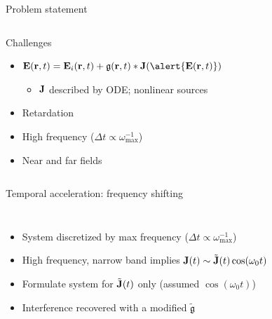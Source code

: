 \documentclass[aspectratio=169, usenames, dvipsnames]{beamer}
\begin{document}
\begin{frame}{Problem statement}
\begin{columns}[t]
      \begin{block}{Challenges}
        \begin{itemize}
          \item $\vb{E}(\vb{r}, t) = \vb{E}_i(\vb{r}, t) + \mathfrak{g}(\vb{r}, t) * \vb{J}(\alert{\vb{E}(\vb{r}, t)})$
            \begin{itemize}
              \item $\vb{J}$ described by ODE; nonlinear sources
            \end{itemize}
          \item Retardation
          \item High frequency ($\Delta t \propto \omega_\text{max}^{-1}$)
          \item Near and far fields
        \end{itemize}
      \end{block}

  \end{columns}
\end{frame}

\begin{frame}{Temporal acceleration: frequency shifting}
  \begin{columns}
      \begin{itemize}
        \item System discretized by max frequency ($\Delta t \propto \omega_\text{max}^{-1}$)
        \item High frequency, narrow band implies $\vb{J}(t) \sim \tilde{\vb{J}}(t)\cos(\omega_0 t)$
        \item Formulate system for $\tilde{\vb{J}}(t)$ only (assumed $\cos(\omega_0 t)$)
        \item Interference recovered with a modified $\tilde{\mathfrak{g}}$
      \end{itemize}

      \vspace{0.5cm}
      
  \end{columns}
\end{frame}
\end{document}
